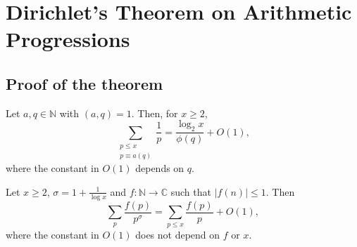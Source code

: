 \section{Dirichlet's Theorem on Arithmetic Progressions}
\subsection{Proof of the theorem}
\begin{theorem}[Dirichlet]\label{thm:theorem_dirichlet}
    Let $a,q \in \mathbb{N}$ with $(a,q)=1$. Then, for $x \ge 2$,
    \begin{equation*}
        \sum_{\substack{p\le x \\ p \equiv a (q)}}\frac{1}{p}=  \frac{\log_2 x}{\phi(q)} + O(1),
    \end{equation*}
    where the constant in $O(1)$ depends on $q$.
\end{theorem}
\begin{lemma}\label{lemma:lemma_dirichlet_theorem}
    Let $x\ge2$, $\sigma = 1 + \frac{1}{\log x}$ and $f:\mathbb{N} \to \mathbb{C}$ such that $\lvert f(n)\rvert\le 1$. Then
    \begin{equation*}
        \sum_{p} \frac{f(p)}{p^\sigma} = \sum_{p \le x} \frac{f(p)}{p} + O(1),
    \end{equation*}
    where the constant in $O(1)$ does not depend on $f$ or $x$.
\end{lemma}
